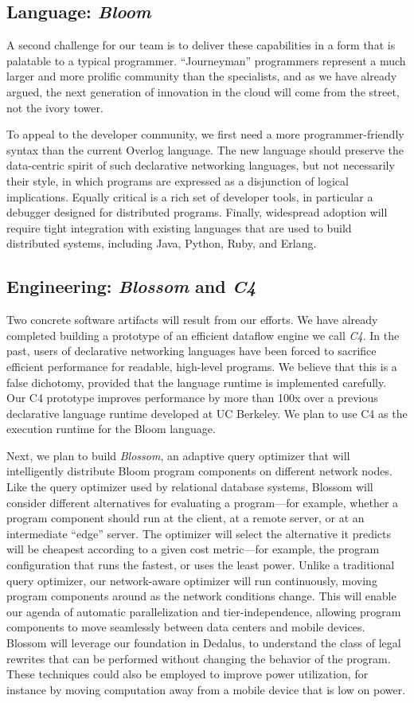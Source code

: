\subsection{Language: \emph{Bloom}}
A second challenge for our team is to deliver these capabilities in a
form that is palatable to a typical programmer.  ``Journeyman''
programmers represent a much larger and more prolific community than
the specialists, and as we have already argued, the next generation of
innovation in the cloud will come from the street, not the ivory
tower.

To appeal to the developer community, we first need a more
programmer-friendly syntax than the current Overlog language. 
The new language should preserve the data-centric spirit of such
declarative networking languages, but not necessarily their style,
in which programs are expressed as a disjunction of logical implications.
Equally
critical is a rich set of developer tools, in particular a debugger
designed for distributed programs.  Finally, widespread adoption will
require tight integration with existing languages that are used to
build distributed systems, including Java, Python, Ruby, and Erlang.

\subsection{Engineering: \emph{Blossom} and \emph{C4}}
Two concrete software artifacts will result from our efforts. 
We have already completed building a prototype of an efficient dataflow
engine we call \emph{C4}. In the past, users of declarative networking
languages have been forced to sacrifice efficient performance for
readable, high-level programs. We believe that this is a false
dichotomy, provided that the language runtime is implemented
carefully. Our C4 prototype improves performance by more than
100x over a previous declarative language runtime developed at UC
Berkeley. We plan to use C4 as the execution runtime for the Bloom
language. 

Next, we plan to
build \emph{Blossom}, an adaptive query optimizer that will intelligently
distribute Bloom program components on different network nodes. Like the query
optimizer used by relational database systems, Blossom will consider different
alternatives for evaluating a program---for example, whether a program component
should run at the client, at a remote server, or at an intermediate ``edge''
server. The optimizer will select the alternative it predicts will be cheapest
according to a given cost metric---for example, the program configuration that
runs the fastest, or uses the least power. Unlike a traditional query optimizer,
our network-aware optimizer will run continuously, moving program components
around as the network conditions change. This will enable our agenda of
automatic parallelization and tier-independence, allowing program components to
move seamlessly between data centers and mobile devices. Blossom will leverage
our foundation in Dedalus, to understand the class of legal rewrites that can be
performed without changing the behavior of the program. These techniques could
also be employed to improve power utilization, for instance by moving
computation away from a mobile device that is low on power.


